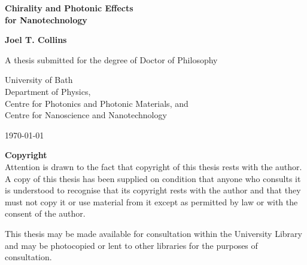 \begin{center}
    \vspace*{1cm}
    
    \LARGE
    \textbf{Chirality and Photonic Effects\\ for Nanotechnology}
    
    \vspace{0.5cm}
    \large
    \textbf{Joel T. Collins}
    
    \vspace{1.5cm}
    \normalsize
    A thesis submitted for the degree of Doctor of Philosophy
    
    \vspace{0.8cm}
    University of Bath\\
    Department of Physics,\\
    Centre for Photonics and Photonic Materials, and\\
    Centre for Nanoscience and Nanotechnology
    
    \vspace{0.5cm}
    \today
    
    \vspace{1.5cm}

    \textbf{Copyright}\\
    Attention is drawn to the fact that copyright of this thesis rests with the author. A copy of this thesis has been supplied on condition that anyone who consults it is understood to recognise that its copyright rests with the author and that they must not copy it or use material from it except as permitted by law or with the consent of the author. 

    \vspace{1.5cm}

    This thesis may be made available for consultation within the University Library and may be photocopied or lent to other libraries for the purposes of consultation. 



\end{center}